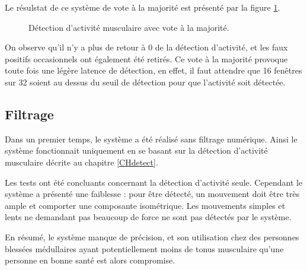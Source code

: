 \documentclass[letterpaper, twoside, 12pt, memoire, creativecommons, hyperref]{thETS}
\begin{document}
Le résulstat de ce système de vote à la majorité est présenté par la figure \ref{fig:onsetAvecVote}.

\begin{figure}
	\centering
	\caption{Détection d'activité musculaire avec vote à la majorité.}
	\label{fig:onsetAvecVote}
\end{figure}

On observe qu'il n'y a plus de retour à 0 de la détection d'activité, et les faux positifs occasionnels ont également été retirés. Ce vote à la majorité provoque toute fois une légère latence de détection, en effet, il faut attendre que 16 fenêtres sur 32 soient au dessus du seuil de détection pour que l'activité soit détectée.

\subsection{Filtrage}\label{CHfiltrage}

Dans un premier temps, le système a été réalisé sans filtrage numérique. Ainsi le système fonctionnait uniquement en se basant sur la détection d'activité musculaire décrite au chapitre \ref{CHdetect}.

Les tests ont été concluants concernant la détection d'activité seule. Cependant le système a présenté une faiblesse : pour être détecté, un mouvement doit être très ample et comporter une composante isométrique. Les mouvements simples et lents ne demandant pas beaucoup de force ne sont pas détectés par le système. 

En résumé, le système manque de précision, et son utilisation chez des personnes blessées médullaires ayant potentiellement moins de tonus musculaire qu'une personne en bonne santé est alors compromise. 
\end{document}
